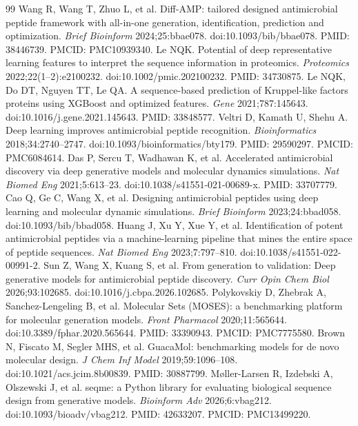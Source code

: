 \documentclass[unnumsec,webpdf,contemporary,large]{oup-authoring-template}
\newcommand{\rev}[1]{#1}
\begin{document}
\begin{thebibliography}{99}
 Wang R, Wang T, Zhuo L, et al. Diff-AMP: tailored designed antimicrobial peptide framework with all-in-one generation, identification, prediction and optimization. \textit{Brief Bioinform} 2024;25:bbae078. doi:10.1093/bib/bbae078. PMID: 38446739. PMCID: PMC10939340.
 \rev{Le NQK. Potential of deep representative learning features to interpret the sequence information in proteomics. \textit{Proteomics} 2022;22(1--2):e2100232. doi:10.1002/pmic.202100232. PMID: 34730875.}
 \rev{Le NQK, Do DT, Nguyen TT, Le QA. A sequence-based prediction of Kruppel-like factors proteins using XGBoost and optimized features. \textit{Gene} 2021;787:145643. doi:10.1016/j.gene.2021.145643. PMID: 33848577.}
 \rev{Veltri D, Kamath U, Shehu A. Deep learning improves antimicrobial peptide recognition. \textit{Bioinformatics} 2018;34:2740--2747. doi:10.1093/bioinformatics/bty179. PMID: 29590297. PMCID: PMC6084614.}
 Das P, Sercu T, Wadhawan K, et al. Accelerated antimicrobial discovery via deep generative models and molecular dynamics simulations. \textit{Nat Biomed Eng} 2021;5:613--23. doi:10.1038/s41551-021-00689-x. PMID: 33707779.
 Cao Q, Ge C, Wang X, et al. Designing antimicrobial peptides using deep learning and molecular dynamic simulations. \textit{Brief Bioinform} 2023;24:bbad058. doi:10.1093/bib/bbad058.
 Huang J, Xu Y, Xue Y, et al. Identification of potent antimicrobial peptides via a machine-learning pipeline that mines the entire space of peptide sequences. \textit{Nat Biomed Eng} 2023;7:797--810. doi:10.1038/s41551-022-00991-2.
 Sun Z, Wang X, Kuang S, et al. From generation to validation: Deep generative models for antimicrobial peptide discovery. \textit{Curr Opin Chem Biol} 2026;93:102685. doi:10.1016/j.cbpa.2026.102685.
 Polykovskiy D, Zhebrak A, Sanchez-Lengeling B, et al. Molecular Sets (MOSES): a benchmarking platform for molecular generation models. \textit{Front Pharmacol} 2020;11:565644. doi:10.3389/fphar.2020.565644. PMID: 33390943. PMCID: PMC7775580.
 Brown N, Fiscato M, Segler MHS, et al. GuacaMol: benchmarking models for de novo molecular design. \textit{J Chem Inf Model} 2019;59:1096--108. doi:10.1021/acs.jcim.8b00839. PMID: 30887799.
 Møller-Larsen R, Izdebski A, Olszewski J, et al. seqme: a Python library for evaluating biological sequence design from generative models. \textit{Bioinform Adv} 2026;6:vbag212. doi:10.1093/bioadv/vbag212. PMID: 42633207. PMCID: PMC13499220.

\end{thebibliography}
\end{document}
